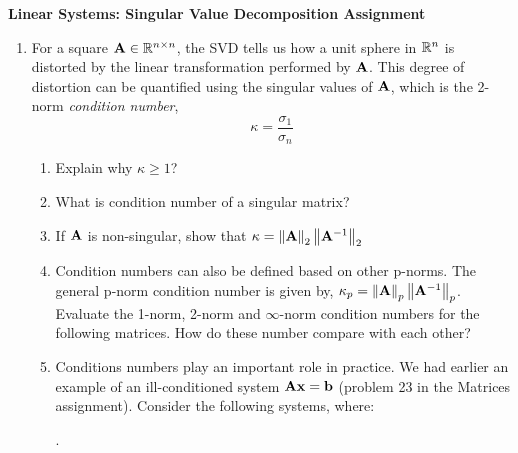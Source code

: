 \documentclass[9pt]{article}
\def\mf{\ensuremath\mathbf}
\def\mb{\ensuremath\mathbb}
\def\lV{\ensuremath\left\lVert}
\def\rV{\ensuremath\right\rVert}
\def\bmx{\ensuremath\begin{bmatrix*}[r]}
\def\emx{\ensuremath\end{bmatrix*}}
\begin{document}
\begin{center}
\begin{Large}
\textbf{Linear Systems: Singular Value Decomposition Assignment}
\end{Large}
\end{center}
\vspace{0.2cm}

\begin{multicols}{2}

\begin{enumerate}
    \item For a square $\mf{A} \in\mb{R}^{n \times n}$, the SVD tells us how a unit sphere in $\mb{R}^n$ is distorted by the linear transformation performed by $\mf{A}$. This degree of distortion can be quantified using the singular values of $\mf{A}$, which is the 2-norm \textit{condition number},
    \[ \kappa = \frac{\sigma_1}{\sigma_n} \]
    \begin{enumerate}
        \item Explain why $\kappa \geq 1$?
        \item What is condition number of a singular matrix?
        \item If $\mf{A}$ is non-singular, show that $\kappa = \lV\mf{A}\rV_2\lV\mf{A}^{-1}\rV_2$
        \item Condition numbers can also be defined based on other p-norms. The general p-norm condition number is given by, $\kappa_p = \lV\mf{A}\rV_p\lV\mf{A}^{-1}\rV_p$. Evaluate the 1-norm, 2-norm and $\infty$-norm condition numbers for the following matrices. How do these number compare with each other?
        \item Conditions numbers play an important role in practice. We had earlier an example of an ill-conditioned system $\mf{Ax} = \mf{b}$ (problem 23 in the Matrices assignment). Consider the following systems, where:
        .


\end{enumerate}
\end{enumerate}
\end{multicols}
\end{document}
